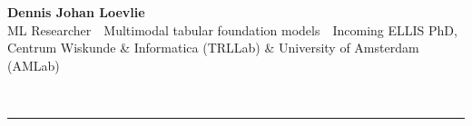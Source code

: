 \documentclass[9pt,letterpaper]{extarticle}
\begin{document}
\noindent\begin{minipage}{\linewidth}
{\fontsize{22pt}{26pt}\selectfont\bfseries Dennis Johan Loevlie}\\[2pt]
{\footnotesize\color{meta}ML Researcher \,\textperiodcentered\, Multimodal tabular foundation models \,\textperiodcentered\, Incoming ELLIS PhD, Centrum Wiskunde \& Informatica (TRLLab) \& University of Amsterdam (AMLab)}
\end{minipage}\\[2pt]
{\color{rule}\rule{\linewidth}{0.5pt}}

\vspace{1pt}

\setlength{\columnsep}{18pt}
\setlength{\columnseprule}{0.4pt}
\end{document}
